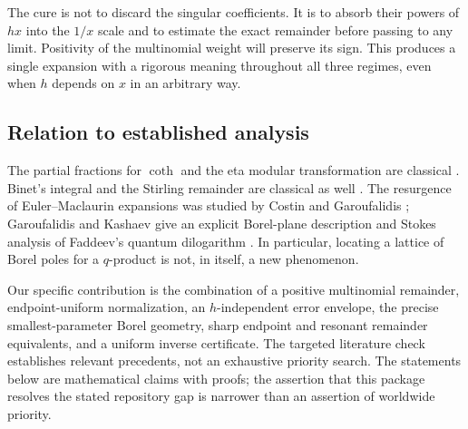 \documentclass[11pt,a4paper]{article}
\numberwithin{equation}{section}
\theoremstyle{definition}\newtheorem{definition}[theorem]{Definition}
\theoremstyle{remark}\newtheorem{remark}[theorem]{Remark}
\begin{document}
The cure is not to discard the singular coefficients. It is to absorb their
powers of $hx$ into the $1/x$ scale and to estimate the exact remainder before
passing to any limit. Positivity of the multinomial weight will preserve its
sign. This produces a single expansion with a rigorous meaning throughout
all three regimes, even when $h$ depends on $x$ in an arbitrary way.

\subsection{Relation to established analysis}
The partial fractions for $\coth$ and the eta modular transformation are
classical \cite{dlmf-hyperbolic,dlmf-eta}. Binet's integral and the Stirling
remainder are classical as well \cite{dlmf-gamma-int,dlmf-gamma-asymp}.
The resurgence of Euler--Maclaurin expansions was studied by Costin and
Garoufalidis \cite{costin-garoufalidis}; Garoufalidis and Kashaev give an explicit
Borel-plane description and Stokes analysis of Faddeev's quantum dilogarithm
\cite{garoufalidis-kashaev}. In particular, locating a lattice of Borel poles
for a $q$-product is not, in itself, a new phenomenon.

Our specific contribution is the combination of a positive multinomial
remainder, endpoint-uniform normalization, an $h$-independent error envelope,
the precise smallest-parameter Borel geometry, sharp endpoint and resonant
remainder equivalents, and a uniform inverse certificate. The targeted literature check
establishes relevant precedents, not an exhaustive priority search. The
statements below are mathematical claims with proofs; the assertion that this
package resolves the stated repository gap is narrower than an assertion of
worldwide priority.
\end{document}
